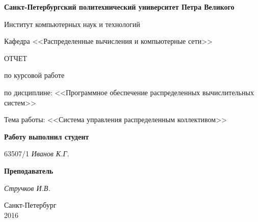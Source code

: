 \begin{titlepage}
\begin{center}

\textbf{Санкт-Петербургский политехнический университет Петра Великого}

\vspace{5mm}
Институт компьютерных наук и технологий

\vspace{5mm}
Кафедра <<Распределенные вычисления и компьютерные сети>>

\vspace*{\fill}

\huge{ОТЧЕТ}

\Large{по курсовой работе}

\large{по дисциплине: <<Программное обеспечение распределенных вычислительных систем>>}

\vspace*{2mm}
\large{Тема работы: <<Система управления распределенным коллективом>>}

\vspace*{\fill}
\end{center}

\begin{large}
\hspace{0.4\linewidth} \textbf{Работу выполнил студент}

\vspace{5mm}
\hspace{0.4\linewidth} 63507/1 \hspace{1cm} \textit{Иванов К.Г.}

\vspace{3mm}
\hspace{0.4\linewidth} \textbf{Преподаватель}

\vspace{5mm}
\hspace{0.4\linewidth} \underline{\hspace{2cm} } \hspace{3mm} \textit{Стручков И.В.}
\end{large}

\vspace*{3cm}

\begin{center}
\normalsize Санкт-Петербург\\2016
\end{center}
\end{titlepage}